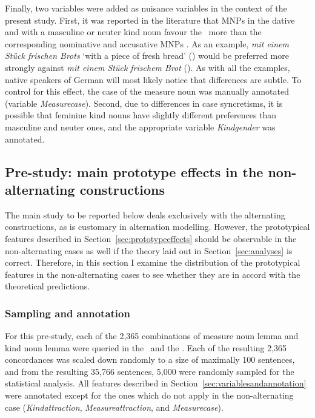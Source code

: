 Finally, two variables were added as nuisance variables in the context of the present study.
First, it was reported in the literature that MNPs in the dative and with a masculine or neuter kind noun favour the \PGCa\ more than the corresponding nominative and accusative MNPs \citep{Hentschel1993,Zimmer2015}.
As an example, \textit{mit einem Stück frischen Brots} `with a piece of fresh bread' (\PGCa) would be preferred more strongly against \textit{mit einem Stück frischem Brot} (\NACa).
As with all the examples, native speakers of German will most likely notice that differences are subtle.
To control for this effect, the case of the measure noun was manually annotated (variable \textit{Measurecase}).
Second, due to differences in case syncretisms, it is possible that feminine kind nouns have slightly different preferences than masculine and neuter ones, and the appropriate variable \textit{Kindgender} was annotated.

\subsection{Pre-study: main prototype effects in the non-alternating constructions}
\label{sec:prestudy}

The main study to be reported below deals exclusively with the alternating constructions, as is customary in alternation modelling.
However, the prototypical features described in Section~\ref{sec:prototypeeffects} should be observable in the non-alternating cases as well if the theory laid out in Section~\ref{sec:analyses} is correct.
Therefore, in this section I examine the distribution of the prototypical features in the non-alternating cases to see whether they are in accord with the theoretical predictions.

\subsubsection{Sampling and annotation}

For this pre-study, each of the 2,365 combinations of measure noun lemma and kind noun lemma were queried in the \NACb\ and the \PGCd.
Each of the resulting 2,365 concordances was scaled down randomly to a size of maximally 100 sentences, and from the resulting 35,766 sentences, 5,000 were randomly sampled for the statistical analysis.
All features described in Section~\ref{sec:variablesandannotation} were annotated except for the ones which do not apply in the non-alternating case (\textit{Kindattraction}, \textit{Measureattraction}, and \textit{Measurecase}).

